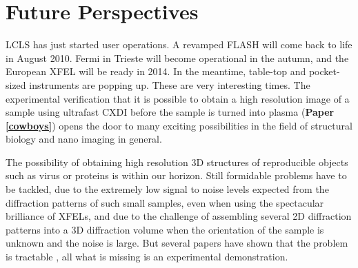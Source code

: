 \chapter{Future Perspectives}\label{Future Perspectives}\noindent

LCLS has just started user operations. A revamped FLASH will come back to life
in August 2010. Fermi in Trieste will become operational in the autumn, and the
European XFEL will be ready in 2014. In the meantime, table-top and pocket-sized
instruments are popping up. These are very interesting times. The experimental
verification that it is possible to obtain a high resolution image of a sample
using ultrafast CXDI before the sample is turned into plasma ({\bf Paper
  \ref{cowboys}}) opens the door to many exciting possibilities in the field of
structural biology and nano imaging in general.

The possibility of obtaining high resolution 3D structures of reproducible
objects such as virus or proteins is within our horizon. Still formidable
problems have to be tackled, due to the extremely low signal to noise levels
expected from the diffraction patterns of such small samples, even when using
the spectacular brilliance of XFELs, and due to the challenge of assembling
several 2D diffraction patterns into a 3D diffraction volume when the
orientation of the sample is unknown and the noise is large. But several papers
have shown that the problem is tractable \cite{VeitNoise,VeitECM,Abbas}, all
what is missing is an experimental demonstration. 

